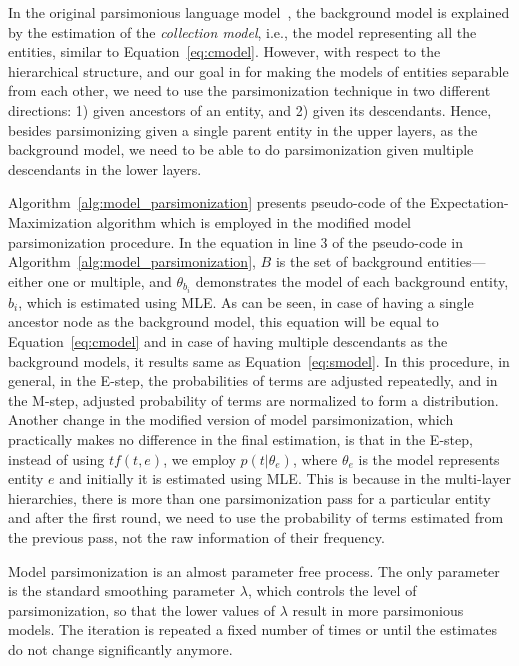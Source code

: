 In the original parsimonious language model~\citep{Hiemstra:2004}, the background model is explained by the estimation of the \emph{collection model}, i.e., the model representing all the entities, similar to Equation~\ref{eq:cmodel}.  
However, with respect to the hierarchical structure, and our goal in \achswlm for making the models of entities separable from each other, we need to use the parsimonization technique in two different directions: 1) given ancestors of an entity, and 2) given its descendants. Hence, besides parsimonizing given a single parent entity in the upper layers, as the background model, we need to be able to do parsimonization given multiple descendants in the lower layers. 

Algorithm~\ref{alg:model_parsimonization} presents pseudo-code of the Expectation-Maximization algorithm which is employed in the modified model parsimonization procedure. 
In the equation in line 3 of the pseudo-code in Algorithm~\ref{alg:model_parsimonization}, $B$ is the set of background entities\:---\:either one or multiple, and $\theta_{b_i}$ demonstrates the model of each background entity, $b_i$, which is estimated using MLE. As can be seen, in case of having a single ancestor node as the background model,  this equation will be equal to Equation~\ref{eq:cmodel} and in case of having multiple descendants as the background models, it results same as Equation~\ref{eq:smodel}. 
In this procedure, in general, in the E-step, the probabilities of terms are adjusted repeatedly, and in the M-step, adjusted probability of terms are normalized to form a distribution. 
Another change in the modified version of model parsimonization, which practically makes no difference in the final estimation, is that in the E-step, instead of using $tf(t,e)$, we employ $p(t|\theta_e)$, where $\theta_e$ is the model represents entity $e$ and initially it is estimated using MLE. This is because in the multi-layer hierarchies, there is more than one parsimonization pass for a particular entity and after the first round, we need to use the probability of terms estimated from the previous pass, not the raw information of their frequency.


Model parsimonization is an almost parameter free process. The only parameter is the standard smoothing parameter $\lambda$, which controls the level of parsimonization, so that the lower values of $\lambda$ result in more parsimonious models.
The iteration is repeated a fixed number of times or until the estimates do not change significantly anymore. 

